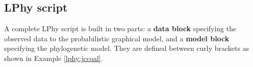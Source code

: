 \documentclass[10pt,letterpaper,table]{article}
\begin{document}


\subsection{LPhy script}

A complete LPhy script is built in two parts: a \textbf{data block} specifying the observed data to the probabilistic graphical model, and a \textbf{model block} specifying the phylogenetic model. They are defined between curly brackets as shown in Example \ref{lphy:jccoal}.
\end{document}
